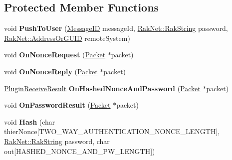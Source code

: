 \subsection*{Protected Member Functions}
\begin{DoxyCompactItemize}
\item 
\hypertarget{class_rak_net_1_1_two_way_authentication_aa2d22284ea40e6a1e6bf1c62508e773c}{void {\bfseries Push\-To\-User} (\hyperlink{namespace_rak_net_a1b2f3bf4bad2bb6a8360a12295fbed0c}{Message\-I\-D} message\-Id, \hyperlink{class_rak_net_1_1_rak_string}{Rak\-Net\-::\-Rak\-String} password, \hyperlink{struct_rak_net_1_1_address_or_g_u_i_d}{Rak\-Net\-::\-Address\-Or\-G\-U\-I\-D} remote\-System)}\label{class_rak_net_1_1_two_way_authentication_aa2d22284ea40e6a1e6bf1c62508e773c}

\item 
\hypertarget{class_rak_net_1_1_two_way_authentication_aa4fb05369f4fe0b1fe58e507aa433234}{void {\bfseries On\-Nonce\-Request} (\hyperlink{struct_rak_net_1_1_packet}{Packet} $\ast$packet)}\label{class_rak_net_1_1_two_way_authentication_aa4fb05369f4fe0b1fe58e507aa433234}

\item 
\hypertarget{class_rak_net_1_1_two_way_authentication_adb3d1c86dfde1e2936742b86f338d778}{void {\bfseries On\-Nonce\-Reply} (\hyperlink{struct_rak_net_1_1_packet}{Packet} $\ast$packet)}\label{class_rak_net_1_1_two_way_authentication_adb3d1c86dfde1e2936742b86f338d778}

\item 
\hypertarget{class_rak_net_1_1_two_way_authentication_ad09abd45101517c051abe3bb1eaa0f39}{\hyperlink{group___p_l_u_g_i_n___i_n_t_e_r_f_a_c_e___g_r_o_u_p_ga89998adaafb29e5d879113b992161085}{Plugin\-Receive\-Result} {\bfseries On\-Hashed\-Nonce\-And\-Password} (\hyperlink{struct_rak_net_1_1_packet}{Packet} $\ast$packet)}\label{class_rak_net_1_1_two_way_authentication_ad09abd45101517c051abe3bb1eaa0f39}

\item 
\hypertarget{class_rak_net_1_1_two_way_authentication_a8628a25977ed9ebf1fe9b67bcb09b3fa}{void {\bfseries On\-Password\-Result} (\hyperlink{struct_rak_net_1_1_packet}{Packet} $\ast$packet)}\label{class_rak_net_1_1_two_way_authentication_a8628a25977ed9ebf1fe9b67bcb09b3fa}

\item 
\hypertarget{class_rak_net_1_1_two_way_authentication_a145fad4caff6d1db1c3dabd9b060366e}{void {\bfseries Hash} (char thier\-Nonce\mbox{[}T\-W\-O\-\_\-\-W\-A\-Y\-\_\-\-A\-U\-T\-H\-E\-N\-T\-I\-C\-A\-T\-I\-O\-N\-\_\-\-N\-O\-N\-C\-E\-\_\-\-L\-E\-N\-G\-T\-H\mbox{]}, \hyperlink{class_rak_net_1_1_rak_string}{Rak\-Net\-::\-Rak\-String} password, char out\mbox{[}H\-A\-S\-H\-E\-D\-\_\-\-N\-O\-N\-C\-E\-\_\-\-A\-N\-D\-\_\-\-P\-W\-\_\-\-L\-E\-N\-G\-T\-H\mbox{]})}\label{class_rak_net_1_1_two_way_authentication_a145fad4caff6d1db1c3dabd9b060366e}

\end{DoxyCompactItemize}
